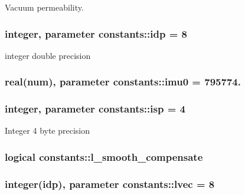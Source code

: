 Vacuum permeability. 

\subsubsection[{\texorpdfstring{idp}{idp}}]{\setlength{\rightskip}{0pt plus 5cm}integer, parameter constants\+::idp = 8}\hypertarget{namespaceconstants_ae345db51770e3628e6aaf76e6a45e160}{}\label{namespaceconstants_ae345db51770e3628e6aaf76e6a45e160}


integer double precision 

\subsubsection[{\texorpdfstring{imu0}{imu0}}]{\setlength{\rightskip}{0pt plus 5cm}real({\bf num}), parameter constants\+::imu0 = 795774.}\hypertarget{namespaceconstants_abcf10ccefe6023e0401ce1b4a5f74fb5}{}\label{namespaceconstants_abcf10ccefe6023e0401ce1b4a5f74fb5}
\subsubsection[{\texorpdfstring{isp}{isp}}]{\setlength{\rightskip}{0pt plus 5cm}integer, parameter constants\+::isp = 4}\hypertarget{namespaceconstants_a5a2ae450a00d2a29f9b70dcb776f7a2f}{}\label{namespaceconstants_a5a2ae450a00d2a29f9b70dcb776f7a2f}


Integer 4 byte precision 

\subsubsection[{\texorpdfstring{l\+\_\+smooth\+\_\+compensate}{l_smooth_compensate}}]{\setlength{\rightskip}{0pt plus 5cm}logical constants\+::l\+\_\+smooth\+\_\+compensate}\hypertarget{namespaceconstants_a91e41f33367410db88a66890aae444cc}{}\label{namespaceconstants_a91e41f33367410db88a66890aae444cc}
\subsubsection[{\texorpdfstring{lvec}{lvec}}]{\setlength{\rightskip}{0pt plus 5cm}integer({\bf idp}), parameter constants\+::lvec = 8}\hypertarget{namespaceconstants_a68354913203e3e01c9b0b547e9d95aae}{}\label{namespaceconstants_a68354913203e3e01c9b0b547e9d95aae}


